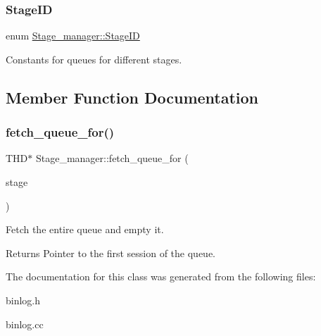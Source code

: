 \subsubsection{\texorpdfstring{Stage\+ID}{StageID}}
{\footnotesize\ttfamily enum \mbox{\hyperlink{classStage__manager_a28879837525f3786d4bcb6f330f4ac69}{Stage\+\_\+manager\+::\+Stage\+ID}}}

Constants for queues for different stages. 

\subsection{Member Function Documentation}
\mbox{\label{classStage__manager_aa5e8259651b127bec0dc58776abb2441}} 
\subsubsection{\texorpdfstring{fetch\+\_\+queue\+\_\+for()}{fetch\_queue\_for()}}
{\footnotesize\ttfamily T\+HD$\ast$ Stage\+\_\+manager\+::fetch\+\_\+queue\+\_\+for (\begin{DoxyParamCaption}\item[{\mbox{\hyperlink{classStage__manager_a28879837525f3786d4bcb6f330f4ac69}{Stage\+ID}}}]{stage }\end{DoxyParamCaption})\hspace{0.3cm}{\ttfamily [inline]}}

Fetch the entire queue and empty it.

\begin{DoxyReturn}{Returns}
Pointer to the first session of the queue. 
\end{DoxyReturn}


The documentation for this class was generated from the following files\+:\begin{DoxyCompactItemize}
\item 
binlog.\+h\item 
binlog.\+cc\end{DoxyCompactItemize}
